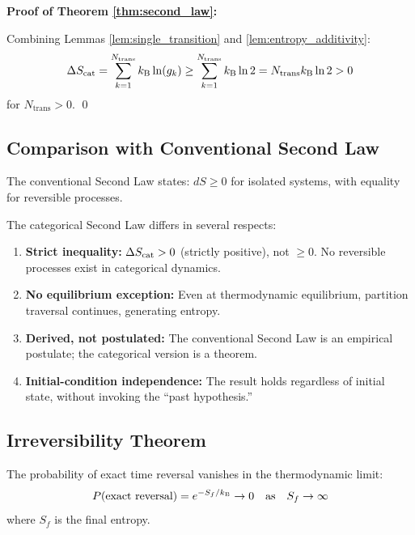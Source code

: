 \textbf{Proof of Theorem \ref{thm:second_law}:}

Combining Lemmas \ref{lem:single_transition} and \ref{lem:entropy_additivity}:
\begin{equation}
\Delta S_{\mathrm{cat}} = \sum_{k=1}^{N_{\text{trans}}} k_{\mathrm{B}} \ln(g_k) \geq \sum_{k=1}^{N_{\text{trans}}} k_{\mathrm{B}} \ln 2 = N_{\text{trans}} k_{\mathrm{B}} \ln 2 > 0
\end{equation}
for $N_{\text{trans}} > 0$. \qed

\subsection{Comparison with Conventional Second Law}

The conventional Second Law states: $dS \geq 0$ for isolated systems, with equality for reversible processes.

The categorical Second Law differs in several respects:

\begin{enumerate}
    \item \textbf{Strict inequality:} $\Delta S_{\mathrm{cat}} > 0$ (strictly positive), not $\geq 0$. No reversible processes exist in categorical dynamics.

    \item \textbf{No equilibrium exception:} Even at thermodynamic equilibrium, partition traversal continues, generating entropy.

    \item \textbf{Derived, not postulated:} The conventional Second Law is an empirical postulate; the categorical version is a theorem.

    \item \textbf{Initial-condition independence:} The result holds regardless of initial state, without invoking the ``past hypothesis.''
\end{enumerate}

\subsection{Irreversibility Theorem}

\begin{theorem}
\label{thm:irreversibility}
The probability of exact time reversal vanishes in the thermodynamic limit:
\begin{equation}
P(\text{exact reversal}) = e^{-S_f/k_{\mathrm{B}}} \to 0 \quad \text{as} \quad S_f \to \infty
\label{eq:irreversibility}
\end{equation}
where $S_f$ is the final entropy.
\end{theorem}

